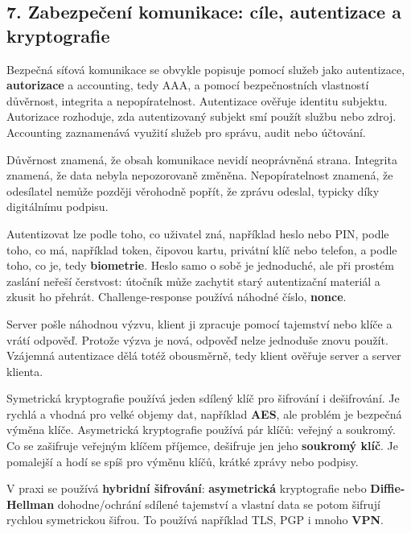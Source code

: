 
\subsection*{7. Zabezpečení komunikace: cíle, autentizace a kryptografie}

Bezpečná síťová komunikace se obvykle popisuje pomocí služeb jako autentizace, \textbf{autorizace} a accounting, tedy AAA, a pomocí bezpečnostních vlastností důvěrnost, integrita a nepopíratelnost. Autentizace ověřuje identitu subjektu. Autorizace rozhoduje, zda autentizovaný subjekt smí použít službu nebo zdroj. Accounting zaznamenává využití služeb pro správu, audit nebo účtování.

Důvěrnost znamená, že obsah komunikace nevidí neoprávněná strana. Integrita znamená, že data nebyla nepozorovaně změněna. Nepopíratelnost znamená, že odesílatel nemůže později věrohodně popřít, že zprávu odeslal, typicky díky digitálnímu podpisu.

Autentizovat lze podle toho, co uživatel zná, například heslo nebo PIN, podle toho, co má, například token, čipovou kartu, privátní klíč nebo telefon, a podle toho, co je, tedy \textbf{biometrie}. Heslo samo o sobě je jednoduché, ale při prostém zaslání neřeší čerstvost: útočník může zachytit starý autentizační materiál a zkusit ho přehrát. Challenge-response používá náhodné číslo, \textbf{nonce}.

Server pošle náhodnou výzvu, klient ji zpracuje pomocí tajemství nebo klíče a vrátí odpověď. Protože výzva je nová, odpověď nelze jednoduše znovu použít. Vzájemná autentizace dělá totéž obousměrně, tedy klient ověřuje server a server klienta.

Symetrická kryptografie používá jeden sdílený klíč pro šifrování i dešifrování. Je rychlá a vhodná pro velké objemy dat, například \textbf{AES}, ale problém je bezpečná výměna klíče. Asymetrická kryptografie používá pár klíčů: veřejný a soukromý. Co se zašifruje veřejným klíčem příjemce, dešifruje jen jeho \textbf{soukromý klíč}. Je pomalejší a hodí se spíš pro výměnu klíčů, krátké zprávy nebo podpisy.

V praxi se používá \textbf{hybridní šifrování}: \textbf{asymetrická} kryptografie nebo \textbf{Diffie-Hellman} dohodne/ochrání sdílené tajemství a vlastní data se potom šifrují rychlou symetrickou šifrou. To používá například TLS, PGP i mnoho \textbf{VPN}.

